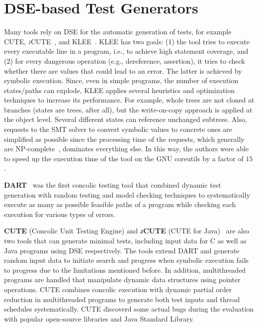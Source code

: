 \documentclass[paper=a4,%
  twoside,%
  BCOR4mm,%
  abstract=true,%
  toc=bibliography,%
  chapterprefix=true,%
  toc=bibliographynumbered,%
  open=right,%
  english,%
  pagesize=pdftex]{scrreprt}
\begin{document}
\section{DSE-based Test Generators}
Many tools rely on \ac{DSE} for the automatic generation of tests, for example \textsc{CUTE}, \textsc{jCUTE}~\cite{Sen2006}, and \textsc{KLEE}~\cite{cadar2008klee}. \textsc{KLEE} has two goals: (1) the tool tries to execute every executable line in a program, i.e., to achieve high statement coverage, and (2) for every dangerous operation (e.g., dereference, assertion), it tries to check whether there are values that could lead to an error. The latter is achieved by symbolic execution. Since, even in simple programs, the number of execution states/paths can explode, \textsc{KLEE} applies several heuristics and optimization techniques to increase its performance. For example, whole trees are not cloned at branches (states are trees, after all), but the write-on-copy approach is applied at the object level. Several different states can reference unchanged subtrees. Also, requests to the \ac{SMT} solver to convert symbolic values to concrete ones are simplified as possible since the processing time of the requests, which generally are NP-complete~\cite{Lewis1983}, dominates everything else. In this way, the authors were able to speed up the execution time of the tool on the GNU coreutils by a factor of $15$.

\textbf{DART}~\cite{Godefroid_2005} was the first concolic testing tool that combined dynamic test generation with random testing and model checking techniques to systematically execute as many as possible feasible paths of a program while checking each execution for various types of errors.


\textbf{CUTE} (Concolic Unit Testing Engine) and \textbf{\textsc{jCUTE}} (CUTE for Java)~\cite{Sen2006} are also two tools that can generate minimal tests, including input data for C as well as Java programs using \ac{DSE} respectively. The tools extend \textsc{DART} and generate random input data to initiate search and progress when symbolic execution fails to progress due to the limitations mentioned before. In addition, multithreaded programs are handled that manipulate dynamic data structures using pointer operations. \textsc{CUTE} combines concolic execution with dynamic partial order reduction in multithreaded programs to generate both test inputs and thread schedules systematically. \textsc{CUTE} discoverd some actual bugs during the evaluation with popular open-source libraries and Java Standard Library.
\end{document}
